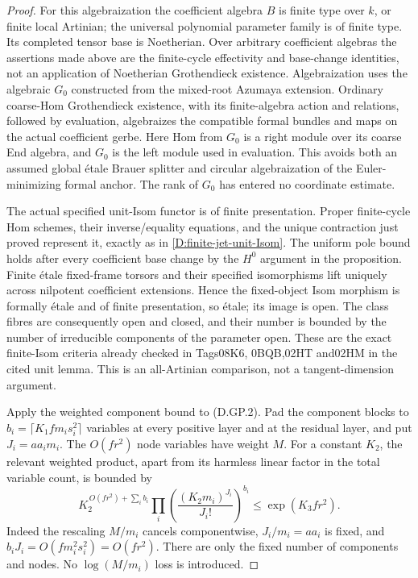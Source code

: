 \begin{proof}
For this algebraization the coefficient algebra
\(B\) is finite type over \(k\), or finite local
Artinian; the universal polynomial parameter
family is of finite type. Its completed tensor
base is Noetherian. Over arbitrary coefficient
algebras the assertions made above are the
finite-cycle effectivity and base-change
identities, not an application of Noetherian
Grothendieck existence.
Algebraization uses the algebraic \(G_0\)
constructed from the mixed-root Azumaya
extension. Ordinary coarse-Hom Grothendieck
existence, with its finite-algebra action
and relations, followed by evaluation,
algebraizes the compatible formal bundles
and maps on the actual coefficient gerbe.
Here Hom from \(G_0\) is a right module over
its coarse End algebra, and \(G_0\) is the
left module used in evaluation. This avoids
both an assumed global étale Brauer splitter
and circular algebraization of the
Euler-minimizing formal anchor. The rank of
\(G_0\) has entered no coordinate estimate.

The actual specified unit-Isom functor is
of finite presentation. Proper finite-cycle
Hom schemes, their inverse/equality equations,
and the unique contraction just proved
represent it, exactly as in
\ref{D:finite-jet-unit-Isom}. The uniform
pole bound holds after every coefficient
base change by the \(H^0\) argument in the
proposition. Finite étale fixed-frame torsors
and their specified isomorphisms lift uniquely
across nilpotent coefficient extensions.
Hence the fixed-object Isom morphism is
formally étale and of finite presentation,
so étale; its image is open. The class
fibres are consequently open and closed,
and their number is bounded by the number
of irreducible components of the parameter
open. These are the exact finite-Isom
criteria already checked in Tags08K6,
0BQB,02HT and02HM in the cited unit lemma.
This is an all-Artinian comparison, not a
tangent-dimension argument.

Apply the weighted component bound to
(D.GP.2). Pad the component blocks to
\(b_i=\lceil K_1 f m_i s_i^2\rceil\)
variables at every positive layer and at
the residual layer, and put \(J_i=aa_i m_i\).
The \(O(fr^2)\) node variables have weight
\(M\). For a constant \(K_2\), the relevant
weighted product, apart from its harmless
linear factor in the total variable count,
is bounded by
\[
 K_2^{\,O(fr^2)+\sum_i b_i}
       \prod_i
       \left(\frac{(K_2 m_i)^{J_i}}{J_i!}\right)^{b_i}
                     \leq \exp(K_3fr^2).              \tag{D.GP.11}
\]
Indeed the rescaling \(M/m_i\) cancels
componentwise, \(J_i/m_i=aa_i\) is fixed,
and \(b_iJ_i=O(fm_i^2s_i^2)=O(fr^2)\).
There are only the fixed number of
components and nodes. No
\(\log(M/m_i)\) loss is introduced.


\end{proof}
